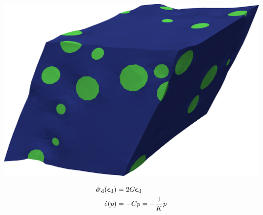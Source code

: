 \documentclass[11pt]{beamer} %
\renewcommand{\dev}{\mathrm{d}}
\begin{document}
\begin{frame}
\begin{center}
 \includegraphics[scale=0.05]{figures/rve6_def.png}
\end{center}
 \begin{align*}
  \hat{\ts\sigma}_\dev(\ts\epsilon_\dev) &= 2 G \ts\epsilon_\dev
\\
  \hat{e}(p) &= -C p = -\frac{1}{K} p
 \end{align*}
\end{frame}
\end{document}
